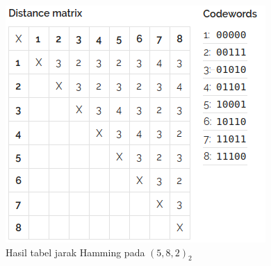 \documentclass[conference,compsoc]{IEEEtran}
\begin{document}
\begin{figure}
\centering
\includegraphics[scale=0.7]{../img/hamming2.png}
\caption{Hasil tabel jarak Hamming pada $(5,8,2)_2$}
\label{fig:hamming2}
\end{figure}
\end{document}
